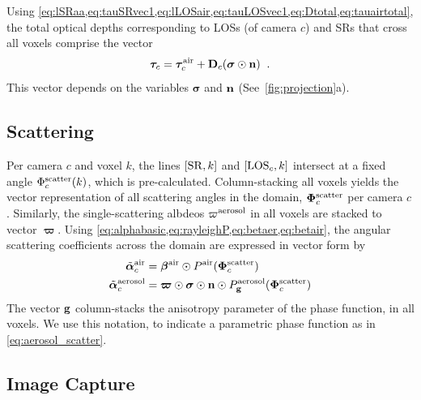 \documentclass[10pt,letterpaper]{article}
\newcommand{\vect}[1]{\bm{#1}}
\begin{document}
Using
\cref{eq:lSRaa,eq:tauSRvec1,eq:lLOSair,eq:tauLOSvec1,eq:Dtotal,eq:tauairtotal},
the total optical depths corresponding to LOSs (of camera $c$) and SRs
that cross all voxels comprise the vector
\begin{equation}
  \vect{\tau}_c= \vect{\tau}_c^{\rm air}
  + {\bf D}_c (\vect{\sigma} \odot {\bf n})
  \;\;.
  \label{eq:tautotal}
\end{equation}
This vector depends on the variables $\vect{\sigma}$ and ${\bf n}$
(See~\cref{fig:projection}a).


\subsection{Scattering}
\label{sec:scattering}

Per camera $c$ and voxel $k$, the lines $[{\rm SR},k]$ and $[{\rm
  LOS}_c,k]$ intersect at a fixed angle $\Phi^{\rm scatter}_c(k)$,
which is pre-calculated.  Column-stacking all voxels yields the vector
representation of all scattering angles in the domain,
$\vect{\Phi}^{\rm scatter}_c$ per camera $c$. Similarly, the
single-scattering albdeos $\varpi^{\rm aerosol}$ in all voxels are
stacked to vector $\vect{\varpi}$.  Using
\cref{eq:alphabasic,eq:rayleighP,eq:betaer,eq:betair}, the angular
scattering coefficients across the domain are expressed in vector form
by
\begin{align}
  \tilde{\vect{\alpha}}^{\rm air}_c &=
  \vect{\beta}^{\rm air} \odot P^{\rm air}(\vect{\Phi}^{\rm scatter}_c) \nonumber \\
  \tilde{\vect{\alpha}}^{\rm aerosol}_c &= \vect{\varpi}\odot
  \vect{\sigma} \odot {\bf n} \odot P^{\rm aerosol}_{\bf
    g}(\vect{\Phi}^{\rm scatter}_c)
  \label{eq:alpha_matrix}
\end{align}
The vector ${\bf g}$ column-stacks the anisotropy parameter of the
phase function, in all voxels. We use this notation, to indicate a
parametric phase function as in \cref{eq:aerosol_scatter}.



\subsection{Image Capture}
\label{sec:captured-image}
\end{document}
